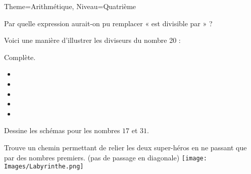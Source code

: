 \documentclass[11pt]{article}
\begin{document}
\begin{multicols}{2}
\begin{Maquette}[Fiche]{Theme=Arithmétique, Niveau=Quatrième}
\begin{exercice}[Calculatrice=false]
    \vspace{1.2em}
    Par quelle expression aurait-on pu remplacer « est divisible par » ?
    
\end{exercice}

\columnbreak

\begin{exercice}
    Voici une manière d’illustrer les diviseurs du nombre 20 :

    \begin{center}
    \end{center}
    
    Complète.
    \begin{itemize}[label={}]
        \item {}
        \item {}
        \item {}
        \item {}
        \item {}
    \end{itemize}
    Dessine les schémas pour les nombres $17$ et $31$.
\end{exercice}

\columnbreak

\begin{exercice}
    Trouve un chemin permettant de relier les deux super-héros en ne passant que par des nombres premiers. (pas de passage en diagonale)
    \texttt{[image: Images/Labyrinthe.png]}
\end{exercice}


\end{Maquette}
\end{multicols}
\end{document}
